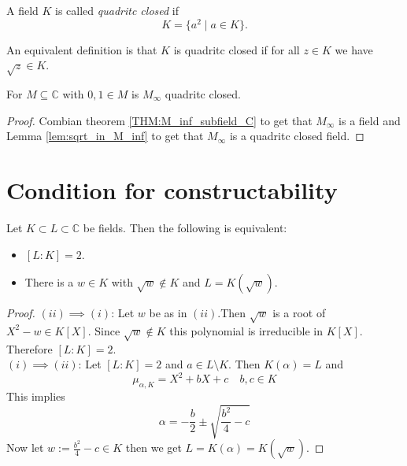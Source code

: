 \begin{definition}
    \label{def:quadritc_closed_field}
    A field $K$ is called \emph{quadritc closed} if $$K=\{a^2\mid a \in K\}.$$
\end{definition}
\begin{remark}
    An equivalent definition is that $K$ is quadritc closed if for all $z \in K$ we have $\sqrt{z} \in K$.
\end{remark}

\begin{lemma}
    \label{lem:M_inf_quad_closed}
    For $M\subseteq \mathbb{C}$ with $0,1 \in M$ is $M_{\infty}$ quadritc closed.
\end{lemma}
\begin{proof}
    Combian theorem \ref{THM:M_inf_subfield_C} to get that $M_{\infty}$ is a field and Lemma \ref{lem:sqrt_in_M_inf} to get that $M_{\infty}$ is a quadritc closed field.
\end{proof}

\section{Condition for constructability}

\begin{lemma}
    \label{lem:dergee2_iff_adjoint_sqrt}
    Let $K\subset L \subset \mathbb{C}$ be fields. Then the following is equivalent:
    \begin{itemize}
        \item $[L:K] = 2$.
        \item There is a $w \in K$ with $\sqrt{w} \notin K$ and $L = K(\sqrt{w})$.
    \end{itemize}
\end{lemma}
\begin{proof}
    $(ii)\implies (i)$: Let $w$ be as in $(ii)$.Then $\sqrt{w}$ is a root of $X^2 - w \in K[X]$. Since $\sqrt{w} \notin K$ this polynomial is irreducible in $K[X]$. Therefore $[L:K] = 2$.\\
    $(i)\implies (ii)$: Let $[L:K] = 2$ and $a \in L \setminus K$. Then $K(\alpha) = L$ and 
    $$\mu_{\alpha, K}=X^2 + bX + c \quad b,c \in K$$
    This implies 
    $$\alpha = -\frac{b}{2} \pm \sqrt{\frac{b^2}{4} - c} $$
    Now let $w := \frac{b^2}{4} - c \in K$ then we get $L = K(\alpha) = K(\sqrt{w})$.
\end{proof}

